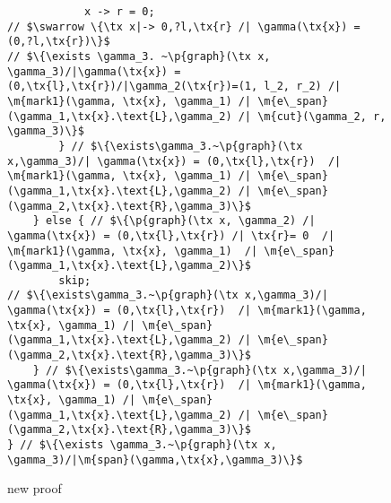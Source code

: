 \documentclass{article}
\newcommand{\tx}[1]{\text{#1}}
\newcommand{\p}[1]{\ensuremath{\mathsf{#1}}} %
\newcommand{\m}[1]{\ensuremath{\mathit{#1}}} %
\begin{document}
\begin{figure}[t]
\begin{lstlisting}
            x -> r = 0;
// $\swarrow \{\tx x|-> 0,?l,\tx{r} /| \gamma(\tx{x}) = (0,?l,\tx{r})\}$
// $\{\exists \gamma_3. ~\p{graph}(\tx x, \gamma_3)/|\gamma(\tx{x}) = (0,\tx{l},\tx{r})/|\gamma_2(\tx{r})=(1, l_2, r_2) /| \m{mark1}(\gamma, \tx{x}, \gamma_1) /| \m{e\_span}(\gamma_1,\tx{x}.\text{L},\gamma_2) /| \m{cut}(\gamma_2, r, \gamma_3)\}$
        } // $\{\exists\gamma_3.~\p{graph}(\tx x,\gamma_3)/| \gamma(\tx{x}) = (0,\tx{l},\tx{r})  /| \m{mark1}(\gamma, \tx{x}, \gamma_1) /| \m{e\_span}(\gamma_1,\tx{x}.\text{L},\gamma_2) /| \m{e\_span}(\gamma_2,\tx{x}.\text{R},\gamma_3)\}$
    } else { // $\{\p{graph}(\tx x, \gamma_2) /| \gamma(\tx{x}) = (0,\tx{l},\tx{r}) /| \tx{r}= 0  /| \m{mark1}(\gamma, \tx{x}, \gamma_1)  /| \m{e\_span}(\gamma_1,\tx{x}.\text{L},\gamma_2)\}$
        skip;
// $\{\exists\gamma_3.~\p{graph}(\tx x,\gamma_3)/| \gamma(\tx{x}) = (0,\tx{l},\tx{r})  /| \m{mark1}(\gamma, \tx{x}, \gamma_1) /| \m{e\_span}(\gamma_1,\tx{x}.\text{L},\gamma_2) /| \m{e\_span}(\gamma_2,\tx{x}.\text{R},\gamma_3)\}$
    } // $\{\exists\gamma_3.~\p{graph}(\tx x,\gamma_3)/| \gamma(\tx{x}) = (0,\tx{l},\tx{r})  /| \m{mark1}(\gamma, \tx{x}, \gamma_1) /| \m{e\_span}(\gamma_1,\tx{x}.\text{L},\gamma_2) /| \m{e\_span}(\gamma_2,\tx{x}.\text{R},\gamma_3)\}$
} // $\{\exists \gamma_3.~\p{graph}(\tx x, \gamma_3)/|\m{span}(\gamma,\tx{x},\gamma_3)\}$
\end{lstlisting}
\caption{new proof}
\end{figure}
\end{document}
